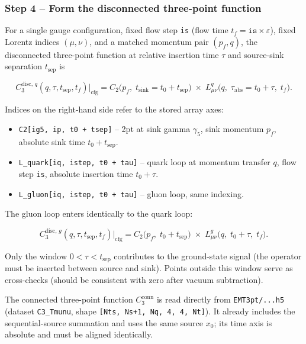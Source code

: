 \documentclass[11pt,a4paper]{article}
\newcommand{\code}[1]{\texttt{#1}}
\begin{document}
\subsubsection{Step 4 -- Form the disconnected three-point function}
\label{sec:analysis_step4}

For a single gauge configuration, fixed flow step \code{is} (flow time
$t_f = \code{is} \times \varepsilon$), fixed Lorentz indices $(\mu,\nu)$,
and a matched momentum pair $(p_f, q)$, the disconnected three-point function
at relative insertion time $\tau$ and source-sink separation $t_{\text{sep}}$ is

\begin{equation}\label{eq:C3_disc_per_cfg}
  C_3^{\text{disc},\,q}(q, \tau, t_{\text{sep}}, t_f)\big|_{\text{cfg}}
    = C_2\big(p_f,\; t_{\text{sink}}{=}t_0{+}t_{\text{sep}}\big)\;
      \times\;
      L_{\mu\nu}^q\big(q,\; \tau_{\text{abs}}{=}t_0{+}\tau,\; t_f\big).
\end{equation}

Indices on the right-hand side refer to the stored array axes:
\begin{itemize}[nosep]
  \item \code{C2[ig5, ip, t0 + tsep]} -- 2pt at sink gamma $\gamma_5$,
    sink momentum $p_f$, absolute sink time $t_0 + t_{\text{sep}}$.
  \item \code{L\_quark[iq, istep, t0 + tau]} -- quark loop at momentum
    transfer $q$, flow step \code{is}, absolute insertion time $t_0 + \tau$.
  \item \code{L\_gluon[iq, istep, t0 + tau]} -- gluon loop, same indexing.
\end{itemize}

The gluon loop enters identically to the quark loop:

\begin{equation}\label{eq:C3_disc_gluon_per_cfg}
  C_3^{\text{disc},\,g}(q, \tau, t_{\text{sep}}, t_f)\big|_{\text{cfg}}
    = C_2\big(p_f,\; t_0{+}t_{\text{sep}}\big)\;
      \times\;
      L_{\mu\nu}^g\big(q,\; t_0{+}\tau,\; t_f\big).
\end{equation}

Only the window $0 < \tau < t_{\text{sep}}$ contributes to the ground-state
signal (the operator must be inserted between source and sink).
Points outside this window serve as cross-checks (should be consistent with
zero after vacuum subtraction).

The connected three-point function $C_3^{\text{conn}}$ is read directly from
\code{EMT3pt/...h5} (dataset \code{C3\_Tmunu}, shape
\code{[Nts, Ns+1, Nq, 4, 4, Nt]}).  It already includes the sequential-source
summation and uses the same source $x_0$; its time axis is absolute and must
be aligned identically.
\end{document}
